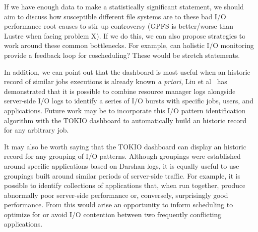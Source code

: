 \documentclass[conference,10pt,compsocconf]{IEEEtran}
\begin{document}
If we have enough data to make a statistically significant statement, we should
aim to discuss how susceptible different file systems are to these bad I/O
performance root causes to stir up controversy (GPFS is better/worse than
Lustre when facing problem X).  If we do this, we can also propose strategies
to work around these common bottlenecks.  For example, can holistic I/O
monitoring provide a feedback loop for coscheduling?  These would be stretch
statements.

In addition, we can point out that the dashboard is most useful when an historic
record of similar jobs executions is already known \emph{a priori}, Liu et al~\cite{Liu2016}
has demonstrated that it is possible to combine resource manager logs alongside
server-side I/O logs to identify a series of I/O bursts with specific jobs,
users, and applications.  Future work may be to incorporate this I/O pattern
identification algorithm with the TOKIO dashboard to automatically build an
historic record for any arbitrary job.

It may also be worth saying that the TOKIO dashboard can display an historic
record for any grouping of I/O patterns.  Although groupings were established
around specific applications based on Darshan logs, it is equally useful to
use groupings built around similar periods of server-side traffic.  For example,
it is possible to identify collections of applications that, when run together,
produce abnormally poor server-side performance or, conversely, surprisingly
good performance.  From this would arise an opportunity to inform scheduling
to optimize for or avoid I/O contention between two frequently conflicting
applications.
\end{document}
